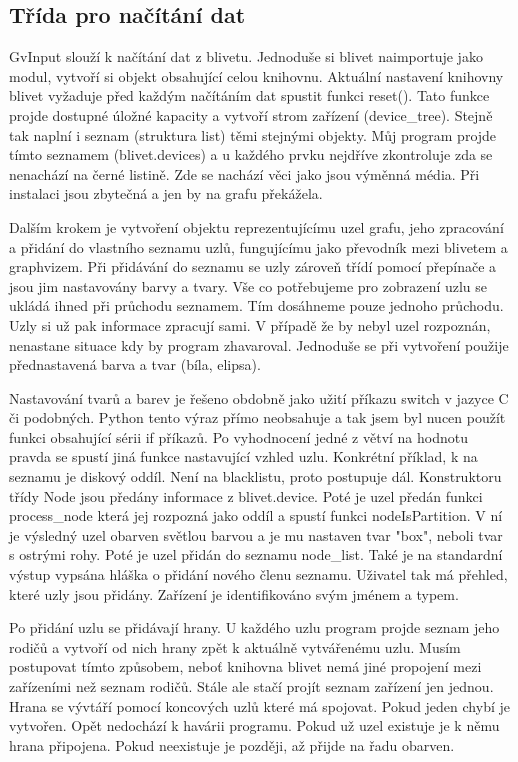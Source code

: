\documentclass[color,table,oneside,nolot,nolof]{fithesis}
\begin{document}
\subsection{Třída pro načítání dat}
	GvInput slouží k načítání dat z blivetu. Jednoduše si blivet naimportuje jako modul, vytvoří si objekt obsahující celou knihovnu. Aktuální nastavení knihovny blivet vyžaduje před 
	každým načítáním dat spustit funkci reset(). Tato funkce projde dostupné úložné kapacity a vytvoří strom zařízení (device\_tree). Stejně tak naplní i seznam (struktura list) těmi
	stejnými objekty. Můj program projde tímto seznamem (blivet.devices) a u každého prvku nejdříve zkontroluje zda se nenachází na černé listině. Zde se nachází věci jako jsou 
	výměnná média. Při instalaci jsou zbytečná a jen by na grafu překážela.

	Dalším krokem je vytvoření objektu reprezentujícímu uzel grafu, jeho zpracování a přidání do vlastního seznamu uzlů, fungujícímu jako převodník mezi blivetem a graphvizem. Při
	přidávání do seznamu se uzly zároveň třídí pomocí přepínače a jsou jim nastavovány barvy a tvary. Vše co potřebujeme pro zobrazení uzlu se ukládá ihned při průchodu seznamem. 
	Tím dosáhneme pouze jednoho průchodu. Uzly si už pak informace zpracují sami. V případě že by nebyl uzel rozpoznán, nenastane situace kdy by program zhavaroval. Jednoduše 
	se při vytvoření použije přednastavená barva a tvar (bíla, elipsa).

	Nastavování tvarů a barev je řešeno obdobně jako užití příkazu switch v jazyce C či podobných. Python tento výraz přímo neobsahuje a tak jsem byl nucen použít funkci obsahující 
	sérii if příkazů. Po vyhodnocení jedné z větví na hodnotu pravda se spustí jiná funkce nastavující vzhled uzlu. Konkrétní příklad, k na seznamu je diskový oddíl. Není na blacklistu,
	proto postupuje dál. Konstruktoru třídy Node jsou předány informace z blivet.device. Poté je uzel předán funkci process\_node která jej rozpozná jako oddíl a spustí funkci 
	nodeIsPartition. V ní je výsledný uzel obarven světlou barvou a je mu nastaven tvar "box", neboli tvar s ostrými rohy. Poté je uzel přidán do seznamu node\_list. Také je na
	standardní výstup vypsána hláška o přidání nového členu seznamu. Uživatel tak má přehled, které uzly jsou přidány. Zařízení je identifikováno svým jménem a typem.

	Po přidání uzlu se přidávají hrany. U každého uzlu program projde seznam jeho rodičů a vytvoří od nich hrany zpět k aktuálně vytvářenému uzlu. Musím postupovat tímto způsobem, neboť
	knihovna blivet nemá jiné propojení mezi zařízeními než seznam rodičů. Stále ale stačí projít seznam zařízení jen jednou. Hrana se vývtáří pomocí koncových uzlů které má spojovat.
	Pokud jeden chybí je vytvořen. Opět nedochází k havárii programu. Pokud už uzel existuje je k němu hrana připojena. Pokud neexistuje je později, až přijde na řadu obarven.
\end{document}
